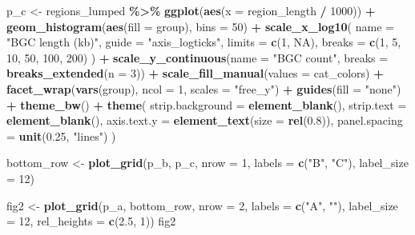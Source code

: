 \documentclass[
]{article}
\newenvironment{Shaded}{\begin{snugshade}}{\end{snugshade}}
\newcommand{\AttributeTok}[1]{\textcolor[rgb]{0.13,0.29,0.53}{#1}}
\newcommand{\ConstantTok}[1]{\textcolor[rgb]{0.56,0.35,0.01}{#1}}
\newcommand{\DecValTok}[1]{\textcolor[rgb]{0.00,0.00,0.81}{#1}}
\newcommand{\FloatTok}[1]{\textcolor[rgb]{0.00,0.00,0.81}{#1}}
\newcommand{\FunctionTok}[1]{\textcolor[rgb]{0.13,0.29,0.53}{\textbf{#1}}}
\newcommand{\NormalTok}[1]{#1}
\newcommand{\OtherTok}[1]{\textcolor[rgb]{0.56,0.35,0.01}{#1}}
\newcommand{\SpecialCharTok}[1]{\textcolor[rgb]{0.81,0.36,0.00}{\textbf{#1}}}
\newcommand{\StringTok}[1]{\textcolor[rgb]{0.31,0.60,0.02}{#1}}
\begin{document}
\begin{Shaded}
\begin{Highlighting}[]
\NormalTok{p\_c }\OtherTok{\textless{}{-}}\NormalTok{ regions\_lumped }\SpecialCharTok{\%\textgreater{}\%}
  \FunctionTok{ggplot}\NormalTok{(}\FunctionTok{aes}\NormalTok{(}\AttributeTok{x =}\NormalTok{ region\_length }\SpecialCharTok{/} \DecValTok{1000}\NormalTok{)) }\SpecialCharTok{+}
  \FunctionTok{geom\_histogram}\NormalTok{(}\FunctionTok{aes}\NormalTok{(}\AttributeTok{fill =}\NormalTok{ group), }\AttributeTok{bins =} \DecValTok{50}\NormalTok{) }\SpecialCharTok{+}
  \FunctionTok{scale\_x\_log10}\NormalTok{(}
    \AttributeTok{name =} \StringTok{"BGC length (kb)"}\NormalTok{,}
    \AttributeTok{guide =} \StringTok{"axis\_logticks"}\NormalTok{,}
    \AttributeTok{limits =} \FunctionTok{c}\NormalTok{(}\DecValTok{1}\NormalTok{, }\ConstantTok{NA}\NormalTok{),}
    \AttributeTok{breaks =} \FunctionTok{c}\NormalTok{(}\DecValTok{1}\NormalTok{, }\DecValTok{5}\NormalTok{, }\DecValTok{10}\NormalTok{, }\DecValTok{50}\NormalTok{, }\DecValTok{100}\NormalTok{, }\DecValTok{200}\NormalTok{)}
\NormalTok{  ) }\SpecialCharTok{+}
  \FunctionTok{scale\_y\_continuous}\NormalTok{(}\AttributeTok{name =} \StringTok{"BGC count"}\NormalTok{, }\AttributeTok{breaks =} \FunctionTok{breaks\_extended}\NormalTok{(}\AttributeTok{n =} \DecValTok{3}\NormalTok{)) }\SpecialCharTok{+}
  \FunctionTok{scale\_fill\_manual}\NormalTok{(}\AttributeTok{values =}\NormalTok{ cat\_colors) }\SpecialCharTok{+}
  \FunctionTok{facet\_wrap}\NormalTok{(}\FunctionTok{vars}\NormalTok{(group), }\AttributeTok{ncol =} \DecValTok{1}\NormalTok{, }\AttributeTok{scales =} \StringTok{"free\_y"}\NormalTok{) }\SpecialCharTok{+}
  \FunctionTok{guides}\NormalTok{(}\AttributeTok{fill =} \StringTok{"none"}\NormalTok{) }\SpecialCharTok{+}
  \FunctionTok{theme\_bw}\NormalTok{() }\SpecialCharTok{+}
  \FunctionTok{theme}\NormalTok{(}
    \AttributeTok{strip.background =} \FunctionTok{element\_blank}\NormalTok{(),}
    \AttributeTok{strip.text =} \FunctionTok{element\_blank}\NormalTok{(),}
    \AttributeTok{axis.text.y =} \FunctionTok{element\_text}\NormalTok{(}\AttributeTok{size =} \FunctionTok{rel}\NormalTok{(}\FloatTok{0.8}\NormalTok{)),}
    \AttributeTok{panel.spacing =} \FunctionTok{unit}\NormalTok{(}\FloatTok{0.25}\NormalTok{, }\StringTok{"lines"}\NormalTok{)}
\NormalTok{  )}

\NormalTok{bottom\_row }\OtherTok{\textless{}{-}} \FunctionTok{plot\_grid}\NormalTok{(p\_b, p\_c, }\AttributeTok{nrow =} \DecValTok{1}\NormalTok{, }\AttributeTok{labels =} \FunctionTok{c}\NormalTok{(}\StringTok{"B"}\NormalTok{, }\StringTok{"C"}\NormalTok{), }\AttributeTok{label\_size =} \DecValTok{12}\NormalTok{)}

\NormalTok{fig2 }\OtherTok{\textless{}{-}} \FunctionTok{plot\_grid}\NormalTok{(p\_a, bottom\_row, }\AttributeTok{nrow =} \DecValTok{2}\NormalTok{, }\AttributeTok{labels =} \FunctionTok{c}\NormalTok{(}\StringTok{"A"}\NormalTok{, }\StringTok{""}\NormalTok{), }\AttributeTok{label\_size =} \DecValTok{12}\NormalTok{, }\AttributeTok{rel\_heights =} \FunctionTok{c}\NormalTok{(}\FloatTok{2.5}\NormalTok{, }\DecValTok{1}\NormalTok{))}
\NormalTok{fig2}
\end{Highlighting}
\end{Shaded}
\end{document}
